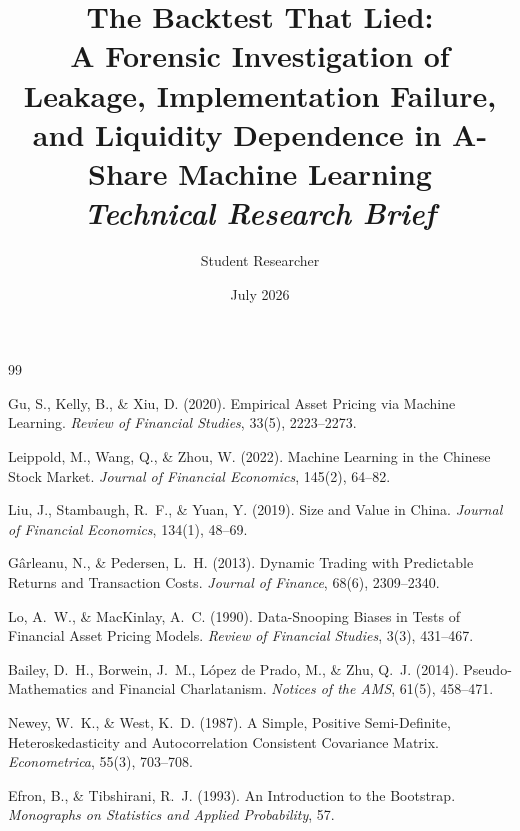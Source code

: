 \documentclass[11pt,a4paper]{article}
\title{The Backtest That Lied:\\[0.3em]
       \large A Forensic Investigation of Leakage, Implementation Failure, \\
       and Liquidity Dependence in A-Share Machine Learning \\[0.2em]
       \normalsize\textit{Technical Research Brief}}
\author{Student Researcher}
\date{July 2026}
\begin{document}
\maketitle













\appendix




\begin{thebibliography}{99}

 Gu, S., Kelly, B., \& Xiu, D. (2020). Empirical Asset Pricing via Machine Learning. \textit{Review of Financial Studies}, 33(5), 2223--2273.

 Leippold, M., Wang, Q., \& Zhou, W. (2022). Machine Learning in the Chinese Stock Market. \textit{Journal of Financial Economics}, 145(2), 64--82.

 Liu, J., Stambaugh, R.\ F., \& Yuan, Y. (2019). Size and Value in China. \textit{Journal of Financial Economics}, 134(1), 48--69.

 G\^arleanu, N., \& Pedersen, L.\ H. (2013). Dynamic Trading with Predictable Returns and Transaction Costs. \textit{Journal of Finance}, 68(6), 2309--2340.

 Lo, A.\ W., \& MacKinlay, A.\ C. (1990). Data-Snooping Biases in Tests of Financial Asset Pricing Models. \textit{Review of Financial Studies}, 3(3), 431--467.

 Bailey, D.\ H., Borwein, J.\ M., L\'opez de Prado, M., \& Zhu, Q.\ J. (2014). Pseudo-Mathematics and Financial Charlatanism. \textit{Notices of the AMS}, 61(5), 458--471.

 Newey, W.\ K., \& West, K.\ D. (1987). A Simple, Positive Semi-Definite, Heteroskedasticity and Autocorrelation Consistent Covariance Matrix. \textit{Econometrica}, 55(3), 703--708.

 Efron, B., \& Tibshirani, R.\ J. (1993). An Introduction to the Bootstrap. \textit{Monographs on Statistics and Applied Probability}, 57.

\end{thebibliography}
\end{document}
